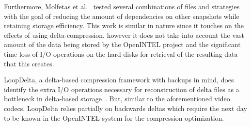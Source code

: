 Furthermore, Molfetas et al.~\cite{DBLP:conf/awc/MolfetasWZ14} tested several combinations of files and strategies 
with the goal of reducing the amount of dependencies on other snapshots while retaining storage efficiency. 
This work is similar in nature since it touches on the effects of using delta-compression, however it does not take into account 
the vast amount of the data being stored by the OpenINTEL project and the significant time loss of 
I/O operations on the hard disks for retrieval of the resulting data that this creates.

LoopDelta, a delta-based compression framework with backups in mind, does identify the extra I/O 
operations necessary for reconstruction of delta files as a bottleneck in delta-based 
storage~\cite{10.1145/3721485}. But, similar to the aforementioned video codecs, LoopDelta relies 
partially on backwards deltas which require the next day to be known in the OpenINTEL system 
for the compression optimization.
